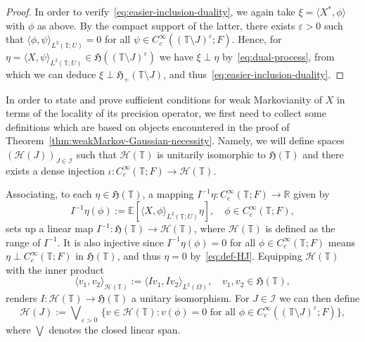 \documentclass[reqno]{amsart}
\numberwithin{equation}{section}
\newcommand{\bbR}{\mathbb{R}}
\newcommand{\bbT}{\mathbb{T}}
\newcommand{\E}{\mathbb{E}}
\newcommand{\cH}{\mathcal{H}}
\newcommand{\scalar}[2]{     \langle #1       \rangle_{ #2 }}
\newcommand{\from}{\colon}
\theoremstyle{remark}
\theoremstyle{definition}
\begin{document}
\begin{proof}
	In order to verify~\eqref{eq:easier-inclusion-duality}, we again take $\xi = \langle X^*, \phi \rangle$
	with $\phi$ as above.
	By the compact support of the latter, there exists $\varepsilon > 0$ such that
	$\scalar{\phi, \psi}{L^2(\bbT; U)} = 0$ for all $\psi \in C_c^\infty((\bbT \setminus J)^\varepsilon; F)$.
	Hence, for $\eta = \scalar{X, \psi}{L^2(\bbT; U)} \in \mathfrak H((\bbT\setminus J)^\varepsilon)$ we have
	$\xi \perp \eta$
	by~\eqref{eq:dual-process}, from which we can deduce $\xi \perp \mathfrak H_+(\bbT \setminus J)$,
	and thus~\eqref{eq:easier-inclusion-duality}.
\end{proof}

In order to state and prove sufficient conditions for weak Markovianity of $X$
in terms of the locality of its precision operator, 
we first need to collect some definitions which are based on objects encountered
in the proof of Theorem~\ref{thm:weakMarkov-Gaussian-necessity}.
Namely, we will define spaces $(\cH(J))_{J \in \mathscr I}$ 
such that $\cH(\bbT)$ is
unitarily isomorphic to $\mathfrak H(\bbT)$
and there exists a dense injection $\iota \from C_c^\infty(\bbT; F) \to \cH(\bbT)$.

Associating,
to each $\eta \in \mathfrak H(\bbT)$,
a mapping $I^{-1} \eta \from C_c^\infty(\bbT; F) \to \bbR$ given by
%
\begin{equation}\label{eq:I-inverse}
	I^{-1} \eta (\phi) := \E[\scalar{X, \phi}{L^2(\bbT; U)} \eta],
	\quad
	\phi \in C_c^\infty(\bbT; F),
\end{equation}
%
sets up a linear map $I^{-1} \from \mathfrak H(\bbT) \to \cH(\bbT)$, 
where $\cH(\bbT)$ is defined as the range of $I^{-1}$.
It is also
injective since $I^{-1} \eta(\phi) = 0$ for all $\phi \in C_c^\infty(\bbT; F)$
means $\eta \perp C_c^\infty(\bbT; F)$ in $\mathfrak H(\bbT)$,
and thus $\eta = 0$ by~\eqref{eq:def-HJ}.
Equipping $\cH(\bbT)$ with the inner product 
%
\[
\scalar{v_1, v_2}{\cH(\bbT)}
:=
\scalar{I v_1, I v_2}{L^2(\Omega)},
\quad 
v_1, v_2 \in \mathfrak H(\bbT),
\]
%
renders
$I \from \cH(\bbT) \to \mathfrak H(\bbT)$
a unitary isomorphism.
For $J \in \mathscr I$ we can then define
%
\begin{equation}\label{eq:def-cHJ}
	\cH(J)
	:=
	\bigvee\nolimits_{\! \! \varepsilon>0}\,
	\{
	v \in \cH(\bbT) : v(\phi) = 0 \text{ for all } \phi \in C_c^\infty((\bbT\setminus J)^{\varepsilon}; F)
	\},
\end{equation}
%
where $\bigvee$ denotes the closed linear span.
\end{document}
